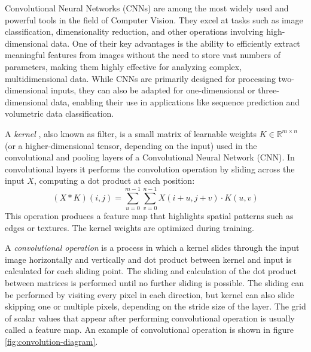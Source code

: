 Convolutional Neural Networks (CNNs) are among the most widely used and powerful tools in the field of Computer Vision. They excel at tasks such as image classification, dimensionality reduction, and other operations involving high-dimensional data. One of their key advantages is the ability to efficiently extract meaningful features from images without the need to store vast numbers of parameters, making them highly effective for analyzing complex, multidimensional data. While CNNs are primarily designed for processing two-dimensional inputs, they can also be adapted for one-dimensional \autocite{8126078} or three-dimensional \autocite{9786658} data, enabling their use in applications like sequence prediction and volumetric data classification.

\begin{definition}
  A \textit{kernel} \autocite{alzubaidi2021review}, also known as filter, is a small matrix of learnable weights $K \in \mathbb{R}^{m \times n}$ (or a higher-dimensional tensor, depending on the input) used in the convolutional and pooling layers of a Convolutional Neural Network (CNN). In convolutional layers it performs the convolution operation by sliding across the input $X$, computing a dot product at each position:
  \[(X * K)(i, j) = \sum_{u=0}^{m-1} \sum_{v=0}^{n-1} X(i+u, j+v) \cdot K(u, v) \]
  This operation produces a feature map that highlights spatial patterns such as edges or textures. The kernel weights are optimized during training.
\end{definition}

\begin{definition}
  A \textit{convolutional operation} \autocite{alzubaidi2021review} is a process in which a kernel slides through the input image horizontally and vertically and dot product between kernel and input is calculated for each sliding point. The sliding and calculation of the dot product between matrices is performed until no further sliding is possible. The sliding can be performed by visiting every pixel in each direction, but kernel can also slide skipping one or multiple pixels, depending on the stride size of the layer. The grid of scalar values that appear after performing convolutional operation is usually called a feature map. An example of convolutional operation is shown in figure \ref{fig:convolution-diagram}.
\end{definition}

